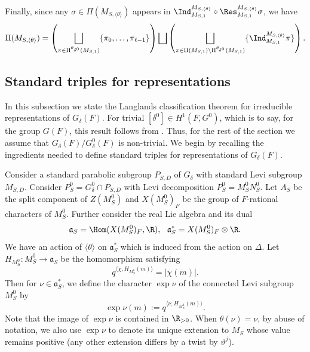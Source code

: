 \documentclass[11pt,letterpaper]{amsart}
\numberwithin{equation}{section}
\begin{document}
Finally, since any $\sigma \in \Pi(M_{S,\langle \theta \rangle})$ appears in $ \Ind_{M_{S,1}}^{M_{S,\langle \theta \rangle}} \circ \Res_{M_{S,1}}^{M_{S,\langle \theta \rangle}} \sigma$, we have 
\begin{align}\label{eq parametrization of rep of disconnected group}
    \Pi(M_{S,\langle \theta \rangle})= \left(\bigsqcup_{ \pi \in \Pi^{\theta_{\delta^0}}(M_{S,1})} \{\pi_0 ,\ldots, \pi_{\ell-1}\}\right) \bigsqcup \left(\bigsqcup_{\pi \in \Pi(M_{S,1})\setminus \Pi^{\theta_{\delta^0}}(M_{S,1})} \{\Ind_{M_{S,1}}^{M_{S,\langle \theta \rangle}}\pi\}\right).
\end{align}


\subsection{Standard triples for representations}\label{subsection: standard representation}


In this subsection we state the Langlands classification theorem for irreducible representations of $G_\delta(F)$.
For trivial $[\delta^0]\in H^1(F,G^0)$, which is to say, for the group $G(F)$, this result follows from \cite{BJ01}. Thus, for the rest of the section we assume that $G_{\delta}(F)/G^0_{\delta}(F)$ is non-trivial.
We begin by recalling the ingredients needed to define standard triples for representations of $G_\delta(F)$.



Consider a standard parabolic subgroup $P_{{S},D}$ of $G_\delta$ with standard Levi subgroup $M_{{S},D}$. 
Consider $P^0_{S}=G^0_\delta\cap P_{{S},D}$ with Levi decomposition $P^0_{S}=M_{{S}}^0N_{{S}}^0.$
Let $A_{{S}}$ be the split component of $Z(M_{{S}}^0)$ and $X(M_{{S}}^0)_F$ be the group of $F$-rational characters of $M_{{S}}^0$. 
Further consider the real Lie algebra and its dual
\[
\mathfrak{a}_{{S}}=\Hom(X(M_{{S}}^0)_F,\R),\ \ \mathfrak{a}^*_{{S}}=X(M_{{S}}^0)_F\otimes\R.
\]
We have an action of $\langle\theta\rangle$ on $\mathfrak{a}^*_{{S}}$ which is induced from the action on $\Delta.$
Let $H_{M_S^0}: M_{S}^0 \to \mathfrak{a}_S$ be the homomorphism satisfying
\[ q^{\langle \chi, H_{M_S^0}(m) \rangle}= |\chi(m)|.\]
Then for $\nu \in \mathfrak{a}_S^{\ast}$,  we define the character $\exp \nu$ of the connected Levi subgroup $M_S^0$ by
\[ \exp \nu (m):= q^{\langle \nu, H_{M_S^0}(m) \rangle}.\]
Note that the image of $\exp \nu$ is contained in $\R_{>0}$. When $\theta(\nu)=\nu$, by abuse of notation, we also use $\exp \nu$ to denote its unique extension to $M_S$ whose value remains positive (any other extension differs by a twist by $\vartheta^j$).
\end{document}
